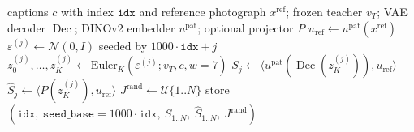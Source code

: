 \documentclass[11pt,a4paper]{article}
\DeclareMathOperator{\Dec}{Dec}
\begin{document}
\begin{algorithm}[H]
\caption{Candidate cache and offline scoring (once per training pool)}
\label{alg:cache}
\begin{algorithmic}[1]
\Require captions $c$ with index $\texttt{idx}$ and reference photograph $x^{\mathrm{ref}}$; frozen teacher $v_T$; VAE decoder $\Dec$; DINOv2 embedder $u^{\mathrm{pat}}$; optional projector $P$
\State $u_{\mathrm{ref}}\gets u^{\mathrm{pat}}(x^{\mathrm{ref}})$ 
  \State $\varepsilon^{(j)}\gets\mathcal{N}(0,I)$ seeded by $1000\cdot\texttt{idx}+j$
  \State $z^{(j)}_0,\dots,z^{(j)}_K\gets\mathrm{Euler}_K(\varepsilon^{(j)};v_T,c,w{=}7)$ 
  \State $S_j\gets\langle u^{\mathrm{pat}}(\Dec(z^{(j)}_K)),u_{\mathrm{ref}}\rangle$ 
  \State $\hat S_j\gets\langle P(z^{(j)}_K),u_{\mathrm{ref}}\rangle$ 
\EndFor
\State $J^{\mathrm{rand}}\gets\mathcal{U}\{1..N\}$ 
\State store $(\texttt{idx},\ \texttt{seed\_base}{=}1000\cdot\texttt{idx},\ S_{1..N},\ \hat S_{1..N},\ J^{\mathrm{rand}})$
\end{algorithmic}
\end{algorithm}
\end{document}
